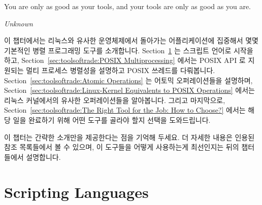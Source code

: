 

\epigraph{You are only as good as your tools, and your tools are only
	  as good as you are.}{\emph{Unknown}}

이 챕터에서는 리눅스와 유사한 운영체제에서 돌아가는 어플리케이션에 집중해서
몇몇 기본적인 병렬 프로그래밍 도구를 소개합니다.
Section~\ref{sec:toolsoftrade:Scripting Languages} 는 스크립트 언어로 시작을
하고,
Section~\ref{sec:toolsoftrade:POSIX Multiprocessing} 에서는 POSIX API 로
지원되는 멀티 프로세스 병렬성을 설명하고 POSIX 쓰레드를 다뤄봅니다.
Section~\ref{sec:toolsoftrade:Atomic Operations} 는 어토믹 오퍼레이션들을
설명하며,
Section~\ref{sec:toolsoftrade:Linux-Kernel Equivalents to POSIX Operations}
에서는 리눅스 커널에서의 유사한 오퍼레이션들을 알아봅니다. 그리고 마지막으로,
Section~\ref{sec:toolsoftrade:The Right Tool for the Job: How to Choose?}
에서는 해당 일을 완료하기 위해 어떤 도구를 골라야 할지 선택을 도와드립니다.

이 챕터는 간략한 소개만을 제공한다는 점을 기억해 두세요.
더 자세한 내용은 인용된 참조 목록들에서 볼 수 있으며, 이 도구들을 어떻게
사용하는게 최선인지는 뒤의 챕터들에서 설명합니다.

\section{Scripting Languages}
\label{sec:toolsoftrade:Scripting Languages}

